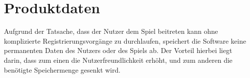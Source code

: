 \section{Produktdaten}
Aufgrund der Tatsache, dass der Nutzer dem Spiel beitreten kann ohne komplizierte Registrierungsvorgänge zu durchlaufen, speichert die Software keine permanenten Daten des Nutzers oder des Spiels ab. Der Vorteil hierbei liegt darin, dass zum einen die Nutzerfreundlichkeit erhöht, und zum anderen die benötigte Speichermenge gesenkt wird.